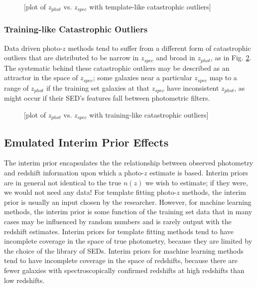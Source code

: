 \documentclass[iop]{emulateapj}
\begin{document}
\begin{figure}
	\begin{center}
		\caption{[plot of $z_{phot}$ vs. $z_{spec}$ with template-like catastrophic outliers]}
		\label{fig:tempcatout}
	\end{center}
\end{figure}

\subsubsection{Training-like Catastrophic Outliers}
\label{sec:traincatout}

Data driven photo-$z$ methods tend to suffer from a different form of catastrophic outliers that are distributed to be narrow in $z_{spec}$ and broad in $z_{phot}$, as in Fig. \ref{fig:traincatout}.  The systematic behind these catastrophic outliers may be described as an attractor in the space of $z_{spec}$; some galaxies near a particular $z_{spec}$ map to a range of $z_{phot}$ if the training set galaxies at that $z_{spec}$ have inconsistent $z_{phot}$, as might occur if their SED's features fall between photometric filters.

\begin{figure}
	\begin{center}
		\caption{[plot of $z_{phot}$ vs. $z_{spec}$ with training-like catastrophic outliers]}
		\label{fig:traincatout}
	\end{center}
\end{figure}

\subsection{Emulated Interim Prior Effects}
\label{sec:priors}

The interim prior encapsulates the the relationship between observed photometry and redshift information upon which a photo-$z$ estimate is based.  Interim priors are in general not identical to the true $n(z)$ we wish to estimate; if they were, we would not need any data!  For template fitting photo-$z$ methods, the interim prior is usually an input chosen by the researcher.  However, for machine learning methods, the interim prior is some function of the training set data that in many cases may be influenced by random numbers and is rarely output with the redshift estimates.  Interim priors for template fitting methods tend to have incomplete coverage in the space of true photometry, because they are limited by the choice of the library of SEDs.  Interim priors for machine learning methods tend to have incomplete coverage in the space of redshifts, because there are fewer galaxies with spectroscopically confirmed redshifts at high redshifts than low redshifts.
\end{document}
